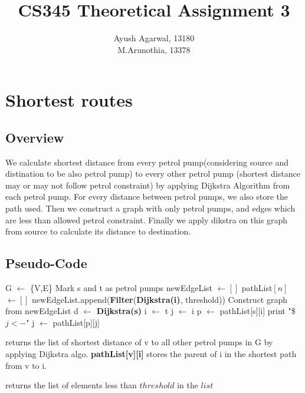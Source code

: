 \documentclass{article}
\title{CS345 Theoretical Assignment 3 \\ }
\author{\vspace{2mm} \large Ayush Agarwal, 13180 \\ M.Arunothia, 13378}
\date{}
\begin{document}
\maketitle
\tableofcontents
\newpage
\section{Shortest routes}
\subsection{Overview}
We calculate shortest distance from every petrol pump(considering source and distination to be also petrol pump) to every other petrol pump 
(shortest distance may or may not follow petrol constraint) by applying Dijkstra Algorithm from each petrol pump. 
For every distance between petrol pumps, we also store the path used. Then we construct a graph
with only petrol pumps, and edges which are less than allowed petrol constraint. Finally we apply dikstra on this graph from source to calculate
its distance to destination. 

\subsection{Pseudo-Code}
\begin{algorithmic}[1]
  \State G $\gets$ \{V,E\}
  \State Mark s and t as petrol pumps
  \State newEdgeList $\gets []$
  \State pathList$[n]$ $\gets []$
  \State newEdgeList.append(\textbf{Filter}(\textbf{Dijkstra(i)}, threshold))
  \EndFor
  \State Construct graph from newEdgeList
  \State d $\gets$ \textbf{Dijkstra(s)}
  \State i $\gets$ t
  \State j $\gets$ i
  \State p $\gets$ pathList[s][i]
  \State print "\$$j<-$"
  \State j $\gets$ pathList[p][j]
  \EndWhile
  \EndWhile
  \EndProcedure
\end{algorithmic} 

\vspace*{0.2cm}
\begin{algorithmic}[1]
    \State returns the list of shortest distance of v to all other petrol pumps in G by applying Dijkstra algo.
    \State \textbf{pathList[v][i]} stores the parent of i in the shortest path from v to i.
  \EndProcedure 
\end{algorithmic}

\vspace*{0.2cm}
\begin{algorithmic}[1]
    \State returns the list of elements less than $threshold$ in the $list$
    \EndProcedure 
\end{algorithmic}
\end{document}
